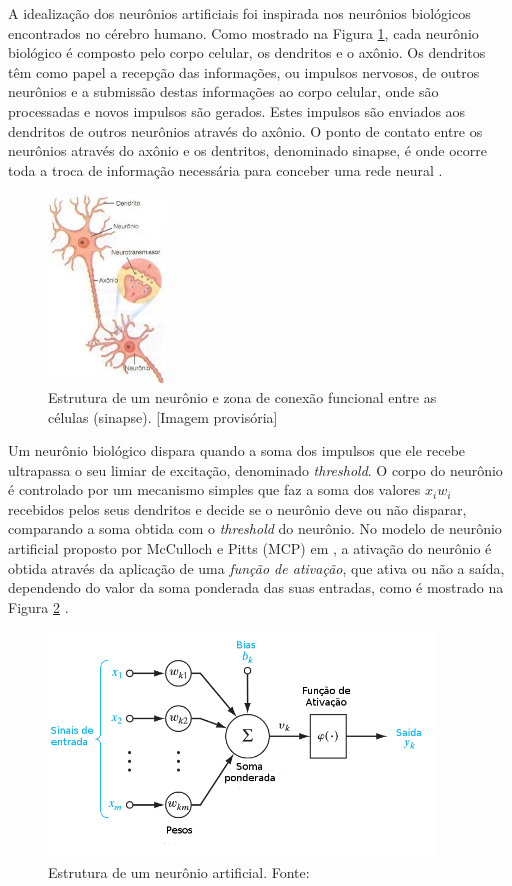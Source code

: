 A idealização dos neurônios artificiais foi inspirada nos neurônios biológicos encontrados no cérebro humano. Como mostrado na Figura \ref{fig:sinapse}, cada neurônio biológico é composto pelo corpo celular, os dendritos e o axônio. Os dendritos têm como papel a recepção das informações, ou impulsos nervosos, de outros neurônios e a submissão destas informações ao corpo celular, onde são processadas e novos impulsos são gerados. Estes impulsos são enviados aos dendritos de outros neurônios através do axônio. O ponto de contato entre os neurônios através do axônio e os dentritos, denominado sinapse, é onde ocorre toda a troca de informação necessária para conceber uma rede neural \cite{braga}.

\begin{figure}
\centering
\includegraphics[height=5cm]{imgs/sinapse}
\caption{Estrutura de um neurônio e zona de conexão funcional entre as células (sinapse). [Imagem provisória]}
\label{fig:sinapse}
\end{figure}


Um neurônio biológico dispara quando a soma dos impulsos que ele recebe ultrapassa o seu limiar de excitação, denominado \emph{threshold}. O corpo do neurônio é controlado por um mecanismo simples que faz a soma dos valores $x_i w_i$ recebidos pelos seus dendritos e decide se o neurônio deve ou não disparar, comparando a soma obtida com o \emph{threshold} do neurônio. No modelo de neurônio artificial proposto por McCulloch e Pitts (MCP) em \cite{mcculloch}, a ativação do neurônio é obtida através da aplicação de uma \emph{função de ativação}, que ativa ou não a saída, dependendo do valor da soma ponderada das suas entradas, como é mostrado na Figura \ref{fig:neuronio-artificial} \cite{braga}.

\begin{figure}[H]
\centering
\includegraphics[height=6cm]{imgs/neuronio-artificial}
\caption{Estrutura de um neurônio artificial. Fonte: \cite{haykin}}
\label{fig:neuronio-artificial}
\end{figure}


